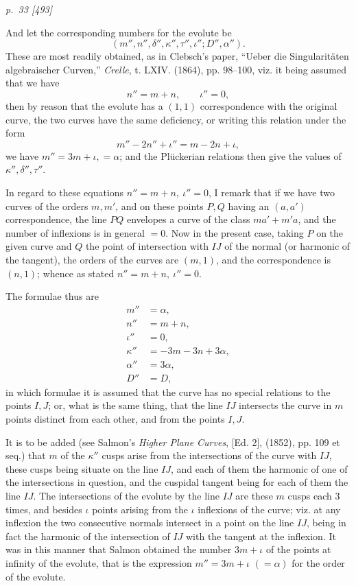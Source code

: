 ﻿\documentclass[11pt,a4paper]{article}
\theoremstyle{plain}
\theoremstyle{definition}
\begin{document}
\clearpage
\textit{p.~33 [493]}

And let the corresponding numbers for the evolute be
\[
(m'',n'',\delta'',\kappa'',\tau'',\iota'';D'',\alpha'').
\]
These are most readily obtained, as in Clebsch's paper, ``Ueber die
Singularit\"aten algebraischer Curven,'' \textit{Crelle}, t. LXIV. (1864),
pp. 98--100, viz. it being assumed that we have
\[
n''=m+n,\qquad \iota''=0,
\]
then by reason that the evolute has a \((1,1)\) correspondence with the
original curve, the two curves have the same deficiency, or writing this
relation under the form
\[
m''-2n''+\iota''=m-2n+\iota,
\]
we have \(m''=3m+\iota,=\alpha\); and the Pl\"uckerian relations then give
the values of \(\kappa'',\delta'',\tau''\).

In regard to these equations \(n''=m+n,\ \iota''=0\), I remark that if we
have two curves of the orders \(m,m'\), and on these points \(P,Q\) having
an \((a,a')\) correspondence, the line \(PQ\) envelopes a curve of the
class \(ma'+m'a\), and the number of inflexions is in general \(=0\). Now
in the present case, taking \(P\) on the given curve and \(Q\) the point of
intersection with \(IJ\) of the normal (or harmonic of the tangent), the
orders of the curves are \((m,1)\), and the correspondence is \((n,1)\);
whence as stated \(n''=m+n,\ \iota''=0\).

The formulae thus are
\[
\begin{aligned}
m''&=\alpha,\\
n''&=m+n,\\
\iota''&=0,\\
\kappa''&=-3m-3n+3\alpha,\\
\alpha''&=3\alpha,\\
D''&=D,
\end{aligned}
\]
in which formulae it is assumed that the curve has no special relations to
the points \(I,J\); or, what is the same thing, that the line \(IJ\)
intersects the curve in \(m\) points distinct from each other, and from the
points \(I,J\).

It is to be added (see Salmon's \textit{Higher Plane Curves}, [Ed. 2],
(1852), pp. 109 et seq.) that \(m\) of the \(\kappa''\) cusps arise from
the intersections of the curve with \(IJ\), these cusps being situate on
the line \(IJ\), and each of them the harmonic of one of the intersections
in question, and the cuspidal tangent being for each of them the line
\(IJ\). The intersections of the evolute by the line \(IJ\) are these \(m\)
cusps each 3 times, and besides \(\iota\) points arising from the \(\iota\)
inflexions of the curve; viz. at any inflexion the two consecutive normals
intersect in a point on the line \(IJ\), being in fact the harmonic of the
intersection of \(IJ\) with the tangent at the inflexion. It was in this
manner that Salmon obtained the number \(3m+\iota\) of the points at
infinity of the evolute, that is the expression \(m''=3m+\iota\)
\((=\alpha)\) for the order of the evolute.
\end{document}

